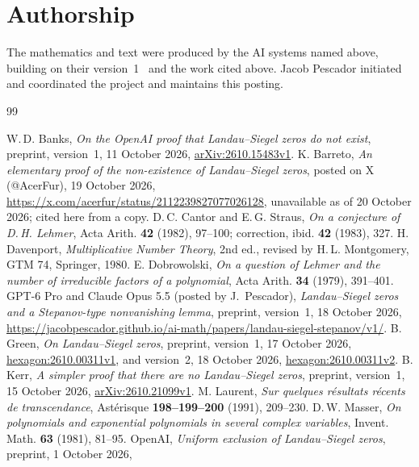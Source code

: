 \documentclass[11pt]{amsart}
\theoremstyle{remark}
\begin{document}
\section*{Authorship}
The mathematics and text were produced by the AI systems named above, building on their version~1~\cite{v1}
and the work cited above. Jacob Pescador initiated and coordinated the project and
maintains this posting.

\begin{thebibliography}{99}\footnotesize\raggedright\setlength{\itemsep}{0pt}
 W.\,D. Banks, \emph{On the OpenAI proof that Landau--Siegel zeros do not exist},
preprint, version~1, 11 October 2026, \href{https://arxiv.org/abs/2610.15483v1}{arXiv:2610.15483v1}.
 K. Barreto, \emph{An elementary proof of the non-existence of Landau--Siegel
zeros}, posted on X (@AcerFur), 19 October 2026,
\url{https://x.com/acerfur/status/2112239827077026128}, unavailable as of 20 October 2026; cited here from a copy.
 D.\,C. Cantor and E.\,G. Straus, \emph{On a conjecture of D.\,H. Lehmer},
Acta Arith. \textbf{42} (1982), 97--100; correction, ibid. \textbf{42} (1983), 327.
 H. Davenport, \emph{Multiplicative Number Theory}, 2nd ed., revised by
H.\,L. Montgomery, GTM 74, Springer, 1980.
 E. Dobrowolski, \emph{On a question of Lehmer and the number of irreducible
factors of a polynomial}, Acta Arith. \textbf{34} (1979), 391--401.
 GPT-6 Pro and Claude Opus 5.5 (posted by J.~Pescador), \emph{Landau--Siegel zeros and a Stepanov-type
nonvanishing lemma}, preprint, version~1, 18 October 2026,
\url{https://jacobpescador.github.io/ai-math/papers/landau-siegel-stepanov/v1/}.
 B. Green, \emph{On Landau--Siegel zeros}, preprint, version~1, 17 October 2026,
\href{https://hexagonmath.org/abs/2610.00311v1}{hexagon:2610.00311v1}, and version~2, 18 October 2026,
\href{https://hexagonmath.org/abs/2610.00311v2}{hexagon:2610.00311v2}.
 B. Kerr, \emph{A simpler proof that there are no Landau--Siegel zeros}, preprint,
version~1, 15 October 2026, \href{https://arxiv.org/abs/2610.21099v1}{arXiv:2610.21099v1}.
 M. Laurent, \emph{Sur quelques r\'esultats r\'ecents de transcendance},
Ast\'erisque \textbf{198--199--200} (1991), 209--230.
 D.\,W. Masser, \emph{On polynomials and exponential polynomials in several complex
variables}, Invent. Math. \textbf{63} (1981), 81--95.
 OpenAI, \emph{Uniform exclusion of Landau--Siegel zeros}, preprint, 1 October 2026,

\end{thebibliography}
\end{document}
